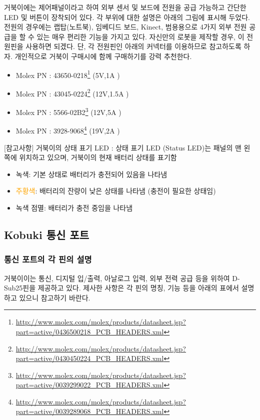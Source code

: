 거북이에는 제어패널이라고 하여 외부 센서 및 보드에 전원을 공급 가능하고 간단한 LED 및 버튼이 장착되어 있다. 각 부위에 대한 설명은 아래의 그림에 표시해 두었다.전원의 경우에는 랩탑(노트북), 임베디드 보드, Kinect, 범용용으로 4가지 외부 전원 공급을 할 수 있는 매우 편리한 기능을 가지고 있다. 자신만의 로봇을 제작할 경우, 이 전원핀을 사용하면 되겠다. 단, 각 전원핀인 아래의 커넥터를 이용하므로 참고하도록 하자. 개인적으로 거북이 구매시에 함께 구매하기를 강력 추천한다.

\begin{itemize}[leftmargin=*]
\item Molex PN : 43650-0218\footnote{\scriptsize\url{http://www.molex.com/molex/products/datasheet.jsp?part=active/0436500218_PCB_HEADERS.xml}} (5V,1A )
\item Molex PN : 43045-0224\footnote{\scriptsize\url{http://www.molex.com/molex/products/datasheet.jsp?part=active/0430450224_PCB_HEADERS.xml}} (12V,1.5A )
\item Molex PN : 5566-02B2\footnote{\scriptsize\url{http://www.molex.com/molex/products/datasheet.jsp?part=active/0039299022_PCB_HEADERS.xml}}  (12V,5A )
\item Molex PN : 3928-9068\footnote{\scriptsize\url{http://www.molex.com/molex/products/datasheet.jsp?part=active/0039289068_PCB_HEADERS.xml}}  (19V,2A )
\end{itemize}

[참고사항] 
거북이의 상태 표기 LED
: 상태 표기 LED (Status LED)는 패널의 맨 왼쪽에 위치하고 있으며, 거북이의 현재 배터리 상태를 표기함
\begin{itemize}[leftmargin=*]
\item {\color{limegreen}녹색}: 기본 상태로 배터리가 충전되어 있음을 나타냄
\item \textcolor{orange}{주황색}: 배터리의 잔량이 낮은 상태를 나타냄 (충전이 필요한 상태임)
\item {\color{limegreen}녹색 점멸}: 배터리가 충전 중임을 나타냄
\end{itemize}

\subsection{Kobuki 통신 포트}

\subsubsection{통신 포트의 각 핀의 설명}
거북이이는 통신, 디지털  입/출력, 아날로그 입력, 외부 전력 공급 등을 위하여 D-Sub25핀을 제공하고 있다. 제사한 사항은 각 핀의 명칭, 기능 등을 아래의 표에서 설명하고 있으니 참고하기 바란다.

